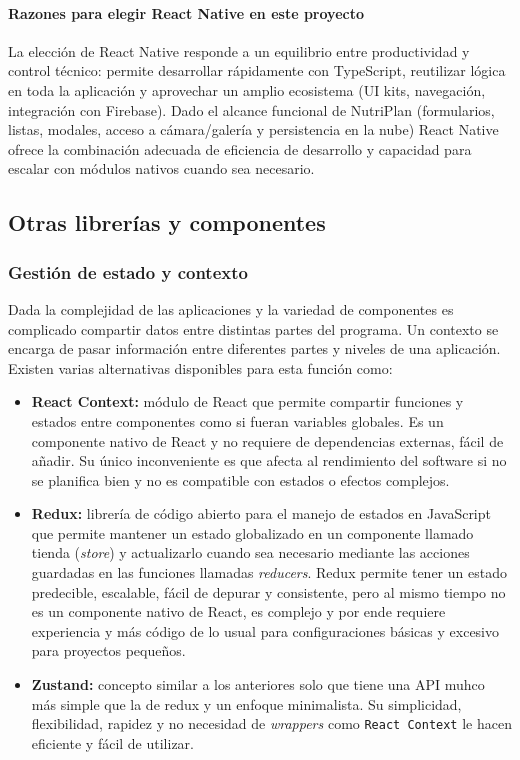 \documentclass[twoside, openright, 11pt]{report}
\begin{document}
	\paragraph{Razones para elegir React Native en este proyecto}
	La elección de React Native responde a un equilibrio entre productividad y control técnico: permite desarrollar rápidamente con TypeScript, reutilizar lógica en toda la aplicación y aprovechar un amplio ecosistema (UI kits, navegación, integración con Firebase). Dado el alcance funcional de NutriPlan (formularios, listas, modales, acceso a cámara/galería y persistencia en la nube) React Native ofrece la combinación adecuada de eficiencia de desarrollo y capacidad para escalar con módulos nativos cuando sea necesario.

	\subsection{Otras librerías y componentes}
	
	
	\subsubsection*{Gestión de estado y contexto}
	Dada la complejidad de las aplicaciones y la variedad de componentes es complicado compartir datos entre distintas partes del programa. Un contexto se encarga de pasar información entre diferentes partes y niveles de una aplicación. Existen varias alternativas disponibles para esta función como:
	
	\begin{itemize}
		\item \textbf{React Context: } módulo de React que permite compartir funciones y estados entre componentes como si fueran variables globales. Es un componente nativo de React y no requiere de dependencias externas, fácil de añadir. Su único inconveniente es que afecta al rendimiento del software si no se planifica bien y no es compatible con estados o efectos complejos.
		\item \textbf{Redux: } librería de código abierto para el manejo de estados en JavaScript que permite mantener un estado globalizado en un componente llamado tienda (\textit{store}) y actualizarlo cuando sea necesario mediante las acciones guardadas en las funciones llamadas \textit{reducers}. Redux permite tener un estado predecible, escalable, fácil de depurar y consistente, pero al mismo tiempo no es un componente nativo de React, es complejo y por ende requiere experiencia y más código de lo usual para configuraciones básicas y excesivo para proyectos pequeños.
		\item \textbf{Zustand: } concepto similar a los anteriores solo que tiene una API muhco más simple que la de redux y un enfoque minimalista. Su simplicidad, flexibilidad, rapidez y no necesidad de \textit{wrappers} como \texttt{React Context} le hacen eficiente y fácil de utilizar.
	\end{itemize}
\end{document}
